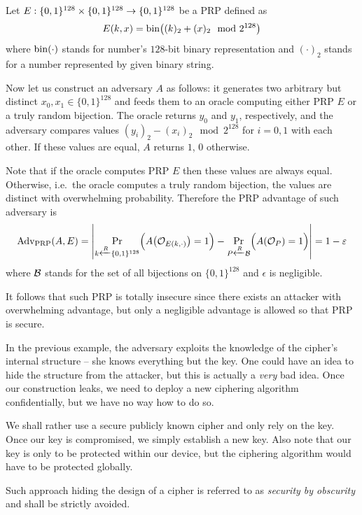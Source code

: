 \begin{example}
	Let $E:\{0,1\}^{128}\times\{0,1\}^{128}\rightarrow\{0,1\}^{128}$ be a PRP defined as
	\[
		E(k,x) = \operatorname*{bin}\bigl((k)_2 + (x)_2\mod{2^{128}}\bigr)
	\]
	where $\operatorname*{bin}(\cdot)$ stands for number's $128$-bit binary representation and $(\cdot)_2$ stands for a number represented by given binary string.
	
	Now let us construct an adversary $A$ as follows: it generates two arbitrary but distinct $x_0,x_1\in\{0,1\}^{128}$ and feeds them to an oracle computing either PRP $E$ or a truly random bijection. The oracle returns $y_0$ and $y_1$, respectively, and the adversary compares values $(y_i)_2 - (x_i)_2 \mod{2^{128}}$ for $i=0,1$ with each other. If these values are equal, $A$ returns $1$, $0$ otherwise.
	
	Note that if the oracle computes PRP $E$ then these values are always equal. Otherwise, i.e.\ the oracle computes a truly random bijection, the values are distinct with overwhelming probability. Therefore the PRP advantage of such adversary is
	\[
		\operatorname*{Adv_{PRP}}(A,E) = \left| \Pr\limits_{k\xleftarrow{R} \{0,1\}^{128}}\Bigl(A\bigl({\cal O}_{E(k,\cdot)}\bigr)=1\Bigr) - \Pr\limits_{P\xleftarrow{R} {\cal B}}\Bigl(A({\cal O}_P)=1\Bigr) \right| = 1 - \varepsilon
	\]
	where $\cal B$ stands for the set of all bijections on $\{0,1\}^{128}$ and $\epsilon$ is negligible.
	
	It follows that such PRP is totally insecure since there exists an attacker with overwhelming advantage, but only a negligible advantage is allowed so that PRP is secure.
\end{example}

\begin{note}
\label{note:secbyobsc}
	In the previous example, the adversary exploits the knowledge of the cipher's internal structure -- she knows everything but the key. One could have an idea to hide the structure from the attacker, but this is actually a {\em very} bad idea. Once our construction leaks, we need to deploy a new ciphering algorithm confidentially, but we have no way how to do so.
	
	We shall rather use a secure publicly known cipher and only rely on the key. Once our key is compromised, we simply establish a new key. Also note that our key is only to be protected within our device, but the ciphering algorithm would have to be protected globally.
	
	Such approach hiding the design of a cipher is referred to as {\em security by obscurity} and shall be strictly avoided.
\end{note}

